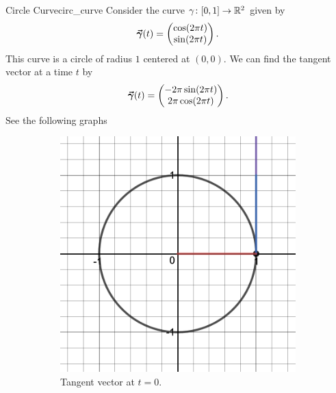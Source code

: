         \begin{ex}{Circle Curve}{circ_curve}
        Consider the curve $\gamma \colon [0,1] \to \mathbb{R}^2$ given by
        \[
        \boldsymbol{\vec{\gamma}}(t)=\begin{pmatrix} \cos (2\pi t) \\ \sin (2\pi t) \end{pmatrix}.
        \]
        This curve is a circle of radius $1$ centered at $(0,0)$.  We can find the tangent vector at a time $t$ by
        \[
        \boldsymbol{\vec{\gamma}}(t)=\begin{pmatrix} -2\pi \sin(2\pi t) \\ 2\pi \cos(2\pi t)\end{pmatrix}.
        \]
        See the following graphs
        
    \begin{figure}[H]
    \centering
    \begin{subfigure}[h]{0.45\textwidth}
        \includegraphics[width=\textwidth]{Figures_Part_6/circ_tang_1.png}
        \caption{Tangent vector at $t=0$.}
    \end{subfigure}
    ~ 
    \begin{subfigure}[h]{0.45\textwidth}

\end{subfigure}
\end{figure}
\end{ex}
